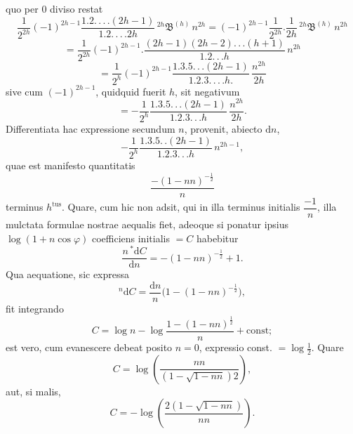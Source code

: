 \par\noindent{}%
quo per $0$ diviso restat
\[
\frac{1}{2^{2h}}(-1)^{2h-1}\frac{1.2.\,.\,.\,.(2h-1)}{1.2.\,.\,.\,. 2h}\,{}^{2h}\mathfrak{B}^{(h)}\,n^{2h} = (-1)^{2h-1}\frac{1}{2^{2h}} . \frac{1}{2h}\,{}^{2h}\mathfrak{B}^{(h)}\,n^{2h}
\]
\[
= \frac{1}{2^{2h}}(-1)^{2h-1} . \frac{(2h-1)(2h-2).\,.\,.(h+1)}{1.2.\,.\,. h}\,n^{2h}
\]
\[
= \frac{1}{2^{h}}(-1)^{2h-1}\frac{1.3.5.\,.\,.(2h-1)}{1.2.3.\,.\,.\,. h.}\,\frac{n^{2h}}{2h}
\]
sive cum $(-1)^{2h-1}$, quidquid fuerit $h$, sit negativum
\[
= -\frac{1}{2^{h}}\frac{1.3.5.\,.\,.(2h-1)}{1.2.3.\,.\,. h}\,\frac{n^{2h}}{2h}.
\]
Differentiata hac expressione secundum $n$, provenit, abiecto $\mathrm{d}n$,
\[
-\frac{1}{2^{h}}\frac{1.3.5.\,.(2h-1)}{1.2.3.\,.\,. h}\,n^{2h-1},
\]
quae est manifesto quantitatis
\[
\frac{-(1-nn)^{-\frac{1}{2}}}{n}
\]
terminus $h^{\mathrm{tus}}$. Quare, cum hic non adsit, qui in illa terminus initialis
$\dfrac{-1}{n}$, illa mulctata formulae nostrae aequalis fiet, adeoque si ponatur ipsius
$\log(1+n\cos\varphi)$ coefficiens initialis $=C$ habebitur
\[
\frac{n\,{}^{*}\!\mathrm{d}C}{\mathrm{d}n} = -(1-nn)^{-\frac{1}{2}}+1.
\]
Qua aequatione, sic expressa
\[
{}^{n}\mathrm{d}C = \frac{\mathrm{d}n}{n}\bigl(1-(1-nn)^{-\frac{1}{2}}\bigr),
\]
fit integrando
\[
C = \log n - \log\frac{1-(1-nn)^{\frac{1}{2}}}{n} + \mathrm{const};
\]
est vero, cum evanescere debeat posito $n=0$, expressio const. $=\log\tfrac{1}{2}$. Quare
\[
C = \log\left(\frac{nn}{(1-\sqrt{1-nn})2}\right),
\]
aut, si malis,
\[
C = -\log\left(\frac{2(1-\sqrt{1-nn})}{nn}\right).
\]

